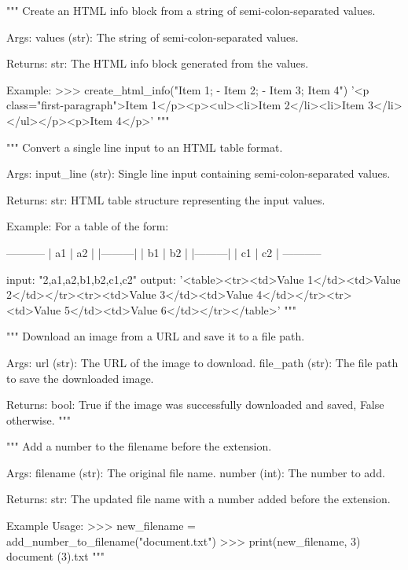 \begin{codebox}
"""
Create an HTML info block from a string of semi-colon-separated values.

Args:
    values (str): The string of semi-colon-separated values.

Returns:
    str: The HTML info block generated from the values.

Example:
    >>> create_html_info("Item 1; - Item 2; - Item 3; Item 4")
    '<p class="first-paragraph">Item 1</p>\n<p><ul><li>Item 2</li>\n<li>Item 3</li>\n</ul></p>\n<p>Item 4</p>\n'
"""
\end{codebox}

\begin{codebox}
"""
Convert a single line input to an HTML table format.

Args:
    input_line (str): Single line input containing semi-colon-separated values.

Returns:
    str: HTML table structure representing the input values.

Example:
    For a table of the form:

    -----------
    | a1 | a2 |
    |---------|
    | b1 | b2 |
    |---------|
    | c1 | c2 |
    -----------

    input: "2,a1,a2,b1,b2,c1,c2"
    output: '<table><tr><td>Value 1</td><td>Value 2</td></tr><tr><td>Value 3</td><td>Value 4</td></tr><tr><td>Value 5</td><td>Value 6</td></tr></table>'
"""
\end{codebox}

\begin{codebox}
"""
Download an image from a URL and save it to a file path.

Args:
    url (str): The URL of the image to download.
    file_path (str): The file path to save the downloaded image.

Returns:
    bool: True if the image was successfully downloaded and saved, False otherwise.
"""
\end{codebox}

\begin{codebox}
"""
Add a number to the filename before the extension.

Args:
    filename (str): The original file name.
    number (int): The number to add.

Returns:
    str: The updated file name with a number added before the extension.

Example Usage:
    >>> new_filename = add_number_to_filename("document.txt")
    >>> print(new_filename, 3)
    document (3).txt
"""
\end{codebox}

